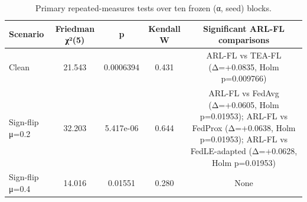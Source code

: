 \begin{table}[t]
\centering
\caption{Primary repeated-measures tests over ten frozen (α, seed) blocks.}
\label{tab:ciciot\_primary\_stats}
\begin{tabular}{lcccc}
\toprule
Scenario & Friedman χ²(5) & p & Kendall W & Significant ARL-FL comparisons \\
\midrule
Clean & 21.543 & 0.0006394 & 0.431 & ARL-FL vs TEA-FL (Δ=+0.0835, Holm p=0.009766) \\
Sign-flip μ=0.2 & 32.203 & 5.417e-06 & 0.644 & ARL-FL vs FedAvg (Δ=+0.0605, Holm p=0.01953); ARL-FL vs FedProx (Δ=+0.0638, Holm p=0.01953); ARL-FL vs FedLE-adapted (Δ=+0.0628, Holm p=0.01953) \\
Sign-flip μ=0.4 & 14.016 & 0.01551 & 0.280 & None \\
\bottomrule
\end{tabular}
\end{table}
